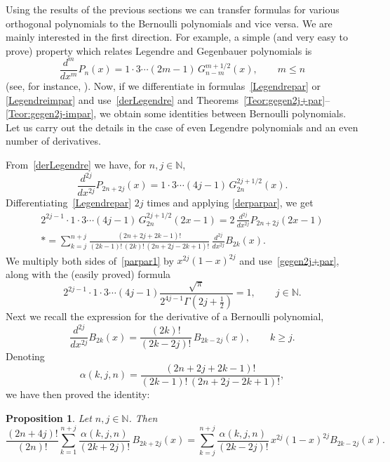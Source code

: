 \documentclass[a4paper,reqno]{amsart}
\newcommand{\N}{\mathbb{N}}
\theoremstyle{plain}
\newtheorem{Prop}[Teor]{Proposition}
\numberwithin{equation}{section}
\theoremstyle{remark}
\begin{document}
Using the results of the previous sections we can transfer formulas for various orthogonal polynomials to the Bernoulli polynomials and vice versa. We are mainly interested in the first direction. For example, a simple (and very easy to prove) property which relates Legendre and Gegenbauer polynomials is
\begin{equation}
\label{derLegendre}
  \frac{d^m}{dx^m} P_n(x) = 1\cdot 3\cdots(2m-1)\,G_{n-m}^{m+1/2}(x),
  \qquad m\leq n
\end{equation}
(see, for instance, \cite[formula 22.5.37, p.~779]{AS}). Now, if we differentiate in formulas~\eqref{Legendrepar} or \eqref{Legendreimpar} and use~\eqref{derLegendre} and Theorems~\ref{Teor:gegen2j+par}--\ref{Teor:gegen2j-impar}, we obtain some identities between Bernoulli polynomials. Let us carry out the details in the case of even Legendre polynomials and an even number of derivatives.

From~\eqref{derLegendre} we have, for $n,j\in\N$,
\begin{equation}
\label{derparpar}
  \frac{d^{2j}}{dx^{2j}} P_{2n+2j}(x) = 1\cdot 3\cdots(4j-1)\,G_{2n}^{2j+1/2}(x).
\end{equation}
Differentiating~\eqref{Legendrepar} $2j$ times and applying \eqref{derparpar}, we get
\begin{multline}
\label{parpar1}
  2^{2j-1}\cdot 1\cdot 3\cdots (4j-1)\,G_{2n}^{2j+1/2}(2x-1) = 2\, \frac{d^{2j}}{dx^{2j}}P_{2n+2j}(2x-1)
  \\*
  = \sum_{k=j}^{n+j} \frac{(2n+2j+2k-1)!}{(2k-1)!\,(2k)!\,(2n+2j-2k+1)!}\, \frac{d^{2j}}{dx^{2j}} B_{2k}(x).
\end{multline}
%
We multiply both sides of~\eqref{parpar1} by $x^{2j} (1-x)^{2j}$ and use~\eqref{gegen2j+par}, along with the (easily proved) formula
\[
  2^{2j-1}\cdot 1\cdot 3\cdots (4j-1) \frac{\sqrt{\pi}}{2^{4j-1}\Gamma(2j+\frac{1}{2})} = 1,
  \qquad j\in\N.
\]
Next we recall the expression for the derivative of a Bernoulli polynomial,
\[
  \frac{d^{2j}}{dx^{2j}} B_{2k}(x) = \dfrac{(2k)!}{(2k-2j)!}\,B_{2k-2j}(x),
  \qquad k\geq j.
\]
Denoting
\[
  \alpha(k,j,n) = \frac{(2n+2j+2k-1)!}{(2k-1)!\,(2n+2j-2k+1)!},
\]
we have then proved the identity:

\begin{Prop} 
\label{Prop:diamanteparpar}
Let $n,j\in\N$. Then
\begin{equation*}
  \frac{(2n+4j)!}{(2n)!} \sum_{k=1}^{n+j} \frac{\alpha(k,j,n)}{(2k+2j)!}\,B_{2k+2j}(x)
  = \sum_{k=j}^{n+j} \frac{\alpha(k,j,n)}{(2k-2j)!} \, x^{2j} (1-x)^{2j} B_{2k-2j}(x).
\end{equation*}
\end{Prop}
\end{document}
